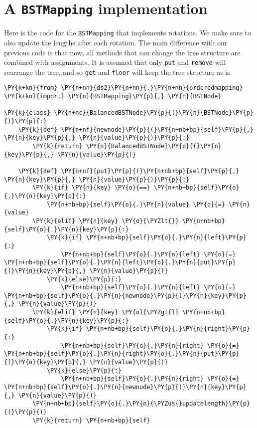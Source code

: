 \section{A \texttt{BSTMapping} implementation}


Here is the code for the \texttt{BSTMapping} that implements rotations.
We make sure to also update the lengths after each rotation.
The main difference with our previous code is that now, all methods that can change the tree structure are combined with assignments.
It is assumed that only \texttt{put} and \texttt{remove} will rearrange the tree, and so \texttt{get} and \texttt{floor} will keep the tree structure as is.

\begin{Verbatim}[commandchars=\\\{\}]
\PY{k+kn}{from} \PY{n+nn}{ds2}\PY{n+nn}{.}\PY{n+nn}{orderedmapping} \PY{k+kn}{import} \PY{n}{BSTMapping}\PY{p}{,} \PY{n}{BSTNode}

\PY{k}{class} \PY{n+nc}{BalancedBSTNode}\PY{p}{(}\PY{n}{BSTNode}\PY{p}{)}\PY{p}{:}
    \PY{k}{def} \PY{n+nf}{newnode}\PY{p}{(}\PY{n+nb+bp}{self}\PY{p}{,} \PY{n}{key}\PY{p}{,} \PY{n}{value}\PY{p}{)}\PY{p}{:}
        \PY{k}{return} \PY{n}{BalancedBSTNode}\PY{p}{(}\PY{n}{key}\PY{p}{,} \PY{n}{value}\PY{p}{)}

    \PY{k}{def} \PY{n+nf}{put}\PY{p}{(}\PY{n+nb+bp}{self}\PY{p}{,} \PY{n}{key}\PY{p}{,} \PY{n}{value}\PY{p}{)}\PY{p}{:}
        \PY{k}{if} \PY{n}{key} \PY{o}{==} \PY{n+nb+bp}{self}\PY{o}{.}\PY{n}{key}\PY{p}{:}
            \PY{n+nb+bp}{self}\PY{o}{.}\PY{n}{value} \PY{o}{=} \PY{n}{value}
        \PY{k}{elif} \PY{n}{key} \PY{o}{\PYZlt{}} \PY{n+nb+bp}{self}\PY{o}{.}\PY{n}{key}\PY{p}{:}
            \PY{k}{if} \PY{n+nb+bp}{self}\PY{o}{.}\PY{n}{left}\PY{p}{:}
                \PY{n+nb+bp}{self}\PY{o}{.}\PY{n}{left} \PY{o}{=} \PY{n+nb+bp}{self}\PY{o}{.}\PY{n}{left}\PY{o}{.}\PY{n}{put}\PY{p}{(}\PY{n}{key}\PY{p}{,} \PY{n}{value}\PY{p}{)}
            \PY{k}{else}\PY{p}{:}
                \PY{n+nb+bp}{self}\PY{o}{.}\PY{n}{left} \PY{o}{=} \PY{n+nb+bp}{self}\PY{o}{.}\PY{n}{newnode}\PY{p}{(}\PY{n}{key}\PY{p}{,} \PY{n}{value}\PY{p}{)}
        \PY{k}{elif} \PY{n}{key} \PY{o}{\PYZgt{}} \PY{n+nb+bp}{self}\PY{o}{.}\PY{n}{key}\PY{p}{:}
            \PY{k}{if} \PY{n+nb+bp}{self}\PY{o}{.}\PY{n}{right}\PY{p}{:}
                \PY{n+nb+bp}{self}\PY{o}{.}\PY{n}{right} \PY{o}{=} \PY{n+nb+bp}{self}\PY{o}{.}\PY{n}{right}\PY{o}{.}\PY{n}{put}\PY{p}{(}\PY{n}{key}\PY{p}{,} \PY{n}{value}\PY{p}{)}
            \PY{k}{else}\PY{p}{:}
                \PY{n+nb+bp}{self}\PY{o}{.}\PY{n}{right} \PY{o}{=} \PY{n+nb+bp}{self}\PY{o}{.}\PY{n}{newnode}\PY{p}{(}\PY{n}{key}\PY{p}{,} \PY{n}{value}\PY{p}{)}
        \PY{n+nb+bp}{self}\PY{o}{.}\PY{n}{\PYZus{}updatelength}\PY{p}{(}\PY{p}{)}
        \PY{k}{return} \PY{n+nb+bp}{self}


\end{Verbatim}
